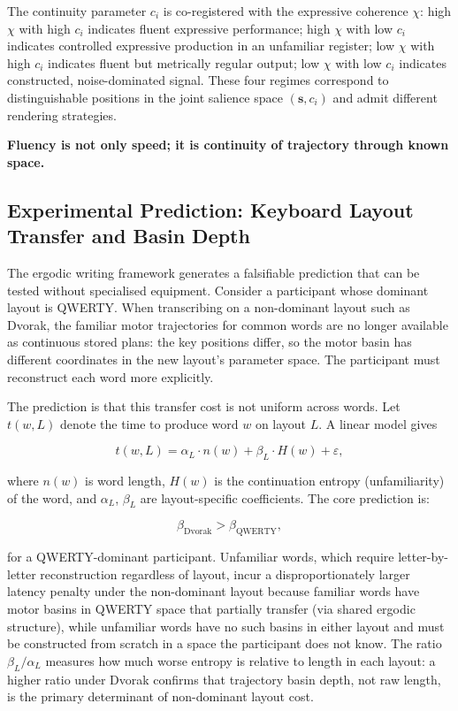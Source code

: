 \documentclass[12pt, a4paper]{article}
\newcommand{\hyperemph}[1]{\textbf{\large #1}}
\begin{document}
The continuity parameter $c_i$ is co-registered with the expressive coherence $\chi$: high $\chi$ with high $c_i$ indicates fluent expressive performance; high $\chi$ with low $c_i$ indicates controlled expressive production in an unfamiliar register; low $\chi$ with high $c_i$ indicates fluent but metrically regular output; low $\chi$ with low $c_i$ indicates constructed, noise-dominated signal. These four regimes correspond to distinguishable positions in the joint salience space $(\mathbf{s}, c_i)$ and admit different rendering strategies.

\begin{center}
\hyperemph{Fluency is not only speed; it is continuity of trajectory through known space.}
\end{center}

\subsection{Experimental Prediction: Keyboard Layout Transfer and Basin Depth}

The ergodic writing framework generates a falsifiable prediction that can be tested without specialised equipment. Consider a participant whose dominant layout is QWERTY. When transcribing on a non-dominant layout such as Dvorak, the familiar motor trajectories for common words are no longer available as continuous stored plans: the key positions differ, so the motor basin has different coordinates in the new layout's parameter space. The participant must reconstruct each word more explicitly.

The prediction is that this transfer cost is not uniform across words. Let $t(w, L)$ denote the time to produce word $w$ on layout $L$. A linear model gives

\begin{equation}
t(w, L) = \alpha_L \cdot n(w) + \beta_L \cdot H(w) + \varepsilon,
\label{eq:transfermodel}
\end{equation}

where $n(w)$ is word length, $H(w)$ is the continuation entropy (unfamiliarity) of the word, and $\alpha_L$, $\beta_L$ are layout-specific coefficients. The core prediction is:

\begin{equation}
\beta_{\mathrm{Dvorak}} > \beta_{\mathrm{QWERTY}},
\label{eq:transferpred}
\end{equation}

for a QWERTY-dominant participant. Unfamiliar words, which require letter-by-letter reconstruction regardless of layout, incur a disproportionately larger latency penalty under the non-dominant layout because familiar words have motor basins in QWERTY space that partially transfer (via shared ergodic structure), while unfamiliar words have no such basins in either layout and must be constructed from scratch in a space the participant does not know. The ratio $\beta_L / \alpha_L$ measures how much worse entropy is relative to length in each layout: a higher ratio under Dvorak confirms that trajectory basin depth, not raw length, is the primary determinant of non-dominant layout cost.
\end{document}
